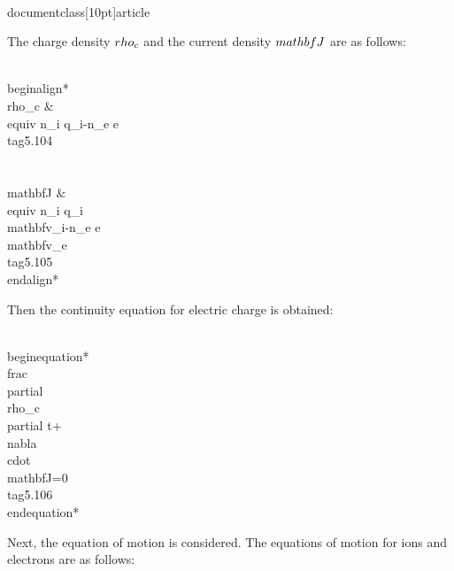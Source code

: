 \\documentclass[10pt]{article}
\begin{document}
{{{{The charge density $\\rho_{c}$ and the current density $\\mathbf{J}$ are as follows:


\\begin{align*}
\\rho_{c} & \\equiv n_{i} q_{i}-n_{e} e  \\tag{5.104}\\\\
\\mathbf{J} & \\equiv n_{i} q_{i} \\mathbf{v}_{i}-n_{e} e \\mathbf{v}_{e} \\tag{5.105}
\\end{align*}


Then the continuity equation for electric charge is obtained:


\\begin{equation*}
\\frac{\\partial \\rho_{c}}{\\partial t}+\\nabla \\cdot \\mathbf{J}=0 \\tag{5.106}
\\end{equation*}


Next, the equation of motion is considered. The equations of motion for ions and electrons are as follows:


}}}}
\end{document}
